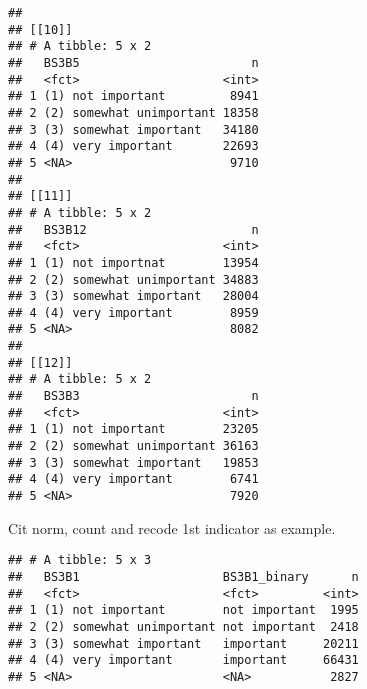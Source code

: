 \documentclass[]{article}
\newenvironment{Shaded}{\begin{snugshade}}{\end{snugshade}}
\newcommand{\CommentTok}[1]{\textcolor[rgb]{0.56,0.35,0.01}{\textit{#1}}}
\newcommand{\DataTypeTok}[1]{\textcolor[rgb]{0.13,0.29,0.53}{#1}}
\newcommand{\KeywordTok}[1]{\textcolor[rgb]{0.13,0.29,0.53}{\textbf{#1}}}
\newcommand{\NormalTok}[1]{#1}
\newcommand{\OperatorTok}[1]{\textcolor[rgb]{0.81,0.36,0.00}{\textbf{#1}}}
\newcommand{\StringTok}[1]{\textcolor[rgb]{0.31,0.60,0.02}{#1}}
\begin{document}
\begin{verbatim}
## 
## [[10]]
## # A tibble: 5 x 2
##   BS3B5                        n
##   <fct>                    <int>
## 1 (1) not important         8941
## 2 (2) somewhat unimportant 18358
## 3 (3) somewhat important   34180
## 4 (4) very important       22693
## 5 <NA>                      9710
## 
## [[11]]
## # A tibble: 5 x 2
##   BS3B12                       n
##   <fct>                    <int>
## 1 (1) not importnat        13954
## 2 (2) somewhat unimportant 34883
## 3 (3) somewhat important   28004
## 4 (4) very important        8959
## 5 <NA>                      8082
## 
## [[12]]
## # A tibble: 5 x 2
##   BS3B3                        n
##   <fct>                    <int>
## 1 (1) not important        23205
## 2 (2) somewhat unimportant 36163
## 3 (3) somewhat important   19853
## 4 (4) very important        6741
## 5 <NA>                      7920
\end{verbatim}

Cit norm, count and recode 1st indicator as example.

\begin{Shaded}
\end{Shaded}

\begin{verbatim}
## # A tibble: 5 x 3
##   BS3B1                    BS3B1_binary      n
##   <fct>                    <fct>         <int>
## 1 (1) not important        not important  1995
## 2 (2) somewhat unimportant not important  2418
## 3 (3) somewhat important   important     20211
## 4 (4) very important       important     66431
## 5 <NA>                     <NA>           2827
\end{verbatim}
\end{document}
